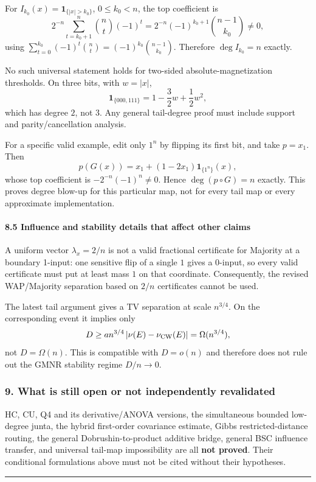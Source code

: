 For \(I_{k_0}(x)=\mathbf1_{\{|x|>k_0\}}\), \(0\le k_0<n\), the top coefficient is
\[2^{-n}\sum_{t=k_0+1}^n\binom nt(-1)^t
=2^{-n}(-1)^{k_0+1}\binom{n-1}{k_0}\ne0,\]
using \(\sum_{t=0}^{k_0}(-1)^t\binom nt=(-1)^{k_0}\binom{n-1}{k_0}\). Therefore \(\deg I_{k_0}=n\) exactly.

No such universal statement holds for two-sided absolute-magnetization thresholds. On three bits, with \(w=|x|\),
\[\mathbf1_{\{000,111\}}=1-\frac32w+\frac12w^2,\]
which has degree \(2\), not \(3\). Any general tail-degree proof must include support and parity/cancellation analysis.

For a specific valid example, edit only \(1^n\) by flipping its first bit, and take \(p=x_1\). Then
\[p(G(x))=x_1+(1-2x_1)\mathbf1_{\{1^n\}}(x),\]
whose top coefficient is \(-2^{-n}(-1)^n\ne0\). Hence \(\deg(p\circ G)=n\) exactly. This proves degree blow-up for this particular map, not for every tail map or every approximate implementation.

\paragraph{8.5 Influence and stability details that affect other claims}\label{influence-and-stability-details-that-affect-other-claims}

A uniform vector \(\lambda_x=2/n\) is not a valid fractional certificate for Majority at a boundary 1-input: one sensitive flip of a single \(1\) gives a 0-input, so every valid certificate must put at least mass \(1\) on that coordinate. Consequently, the revised WAP/Majority separation based on \(2/n\) certificates cannot be used.

The latest tail argument gives a TV separation at scale \(n^{3/4}\). On the corresponding event it implies only
\[D\ge a n^{3/4}\,|\nu(E)-\nu_{\rm CW}(E)|=\Omega(n^{3/4}),\]
not \(D=\Omega(n)\). This is compatible with \(D=o(n)\) and therefore does not rule out the GMNR stability regime \(D/n\to0\).

\subsubsection{9. What is still open or not independently revalidated}\label{what-is-still-open-or-not-independently-revalidated}

HC, CU, Q4 and its derivative/ANOVA versions, the simultaneous bounded low-degree junta, the hybrid first-order covariance estimate, Gibbs restricted-distance routing, the general Dobrushin-to-product additive bridge, general BSC influence transfer, and universal tail-map impossibility are all \textbf{not proved}. Their conditional formulations above must not be cited without their hypotheses.

\begin{center}\rule{0.5\linewidth}{0.5pt}\end{center}
